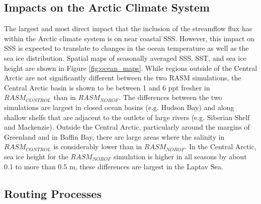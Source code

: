 \documentclass[jgrga, draft]{agutex}
\begin{document}
\begin{article}
\subsection{Impacts on the Arctic Climate System}
The largest and most direct impact that the inclusion of the streamflow flux has within the Arctic climate system is on near coastal SSS.
However, this impact on SSS is expected to translate to changes in the ocean temperature as well as the sea ice distribution.
Spatial maps of seasonally averaged SSS, SST, and sea ice height are shown in Figure \ref{fig:ocean_maps}.
While regions outside of the Central Arctic are not significantly different between the two RASM simulations, the Central Arctic basin is shown to be between 1 and 6 ppt fresher in $RASM_{CONTROL}$ than in $RASM_{NOROF}$.
The differences between the two simulations are largest in closed ocean basins (e.g. Hudson Bay) and along shallow shelfs that are adjacent to the outlets of large rivers (e.g. Siberian Shelf and Mackenzie).
Outside the Central Arctic, particularly around the margins of Greenland and in Baffin Bay, there are large areas where the salinity in $RASM_{CONTROL}$ is considerably lower than in $RASM_{NOROF}$.
In the Central Arctic, sea ice height for the $RASM_{NOROF}$ simulation is higher in all seasons by about 0.1 to more than 0.5 m, these differences are largest in the Laptav Sea.

\subsection{Routing Processes}


\end{article}
\end{document}
